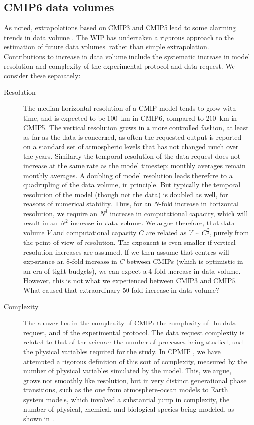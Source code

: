 \documentclass[gmd,manuscript]{copernicus}
\newcommand{\bibref}[1] { \cite{ref:#1}}
\newcommand{\pipref}[1] {\citep{ref:#1}}
\begin{document}
\subsection{CMIP6 data volumes}
\label{sec:dvol}

As noted, extrapolations based on CMIP3 and CMIP5 lead to some
alarming trends in data volume \citep[see
e.g.,][]{ref:overpecketal2011}. The WIP has undertaken a rigorous
approach to the estimation of future data volumes, rather than simple
extrapolation. Contributions to increase in data volume include the
systematic increase in model resolution and complexity of the
experimental protocol and data request. We consider these separately:

\begin{description}
\item[Resolution] The median horizontal resolution of a CMIP model
  tends to grow with time, and is expected to be 100~km in CMIP6,
  compared to 200~km in CMIP5. The vertical resolution grows in a more
  controlled fashion, at least as far as the data is concerned, as
  often the requested output is reported on a standard set of
  atmospheric levels that has not changed much over the years.
  Similarly the temporal resolution of the data request does not
  increase at the same rate as the model timestep: monthly averages
  remain monthly averages. A doubling of model resolution leads
  therefore to a quadrupling of the data volume, in principle. But
  typically the temporal resolution of the model (though not the data)
  is doubled as well, for reasons of numerical stability. Thus, for an
  $N$-fold increase in horizontal resolution, we require an $N^3$
  increase in computational capacity, which will result in an $N^2$
  increase in data volume. We argue therefore, that data volume $V$
  and computational capacity $C$ are related as $V \sim C^\frac23$,
  purely from the point of view of resolution. The exponent is even
  smaller if vertical resolution increases are assumed. If we then
  assume that centres will experience an 8-fold increase in $C$
  between CMIPs (which is optimistic in an era of tight budgets), we
  can expect a 4-fold increase in data volume. However, this is not
  what we experienced between CMIP3 and CMIP5. What caused that
  extraordinary 50-fold increase in data volume?
\item[Complexity] The answer lies in the complexity of CMIP: the
  complexity of the data request, and of the experimental protocol.
  The data request complexity is related to that of the science: the
  number of processes being studied, and the physical variables
  required for the study. In CPMIP \pipref{balajietal2017}, we have
  attempted a rigorous definition of this sort of complexity, measured
  by the number of physical variables simulated by the model. This, we
  argue, grows not smoothly like resolution, but in very distinct
  generational phase transitions, such as the one from
  atmosphere-ocean models to Earth system models, which involved a
  substantial jump in complexity, the number of physical, chemical,
  and biological species being modeled, as shown in
  \bibref{balajietal2017}.


\end{description}
\end{document}
